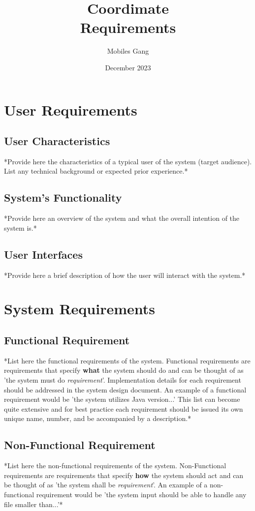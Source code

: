 \documentclass{article}
\title{Coordimate\\ Requirements}
\date{December 2023}
\author{Mobiles Gang}
\begin{document}
\maketitle

\section{User Requirements}

\subsection{User Characteristics}

*Provide here the characteristics of a typical user of the system (target
audience). List any technical background or expected prior experience.*  

\subsection{System's Functionality}

*Provide here an overview of the system and what the overall intention of the
system is.* 
      
\subsection{User Interfaces }

*Provide here a brief description of how the user will interact with the
system.*


\section{System Requirements}

\subsection{Functional Requirement}

*List here the functional requirements of the system. Functional requirements
are requirements that specify \textbf{what} the system should do and can be
thought of as 'the system must do \textit{requirement}'. Implementation details
for each requirement should be addressed in the system design document. An
example of a functional requirement would be 'the system utilizes Java
version...' This list can become quite extensive and for best practice each
requirement should be issued its own unique name, number, and be accompanied by
a description.*

\subsection{Non-Functional Requirement}

*List here the non-functional requirements of the system. Non-Functional
requirements are requirements that specify \textbf{how} the system should act
and can be thought of as 'the system shall be \textit{requirement}'. An example
of a non-functional requirement would be 'the system input should be able to
handle any file smaller than...'*
\end{document}

